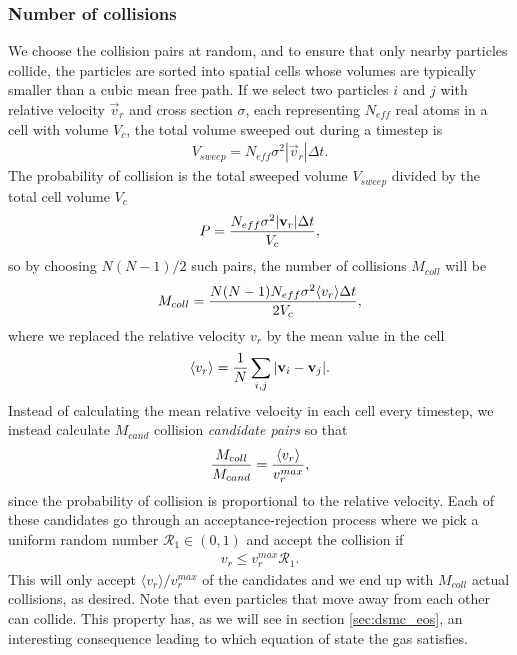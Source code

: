 \subsubsection{Number of collisions}
We choose the collision pairs at random, and to ensure that only nearby particles collide, the particles are sorted into spatial cells whose volumes are typically smaller than a cubic mean free path. If we select two particles $i$ and $j$ with relative velocity $\vec v_r$ and cross section $\sigma$, each representing $N_{eff}$ real atoms in a cell with volume $V_c$, the total volume sweeped out during a timestep is
\begin{align}
	V_{sweep} = N_{eff}\sigma^2|\vec v_r|\Delta t.
\end{align}
The probability of collision is the total sweeped volume $V_{sweep}$ divided by the total cell volume $V_c$
\begin{align}
	P = {N_{eff}\sigma^2|\vec v_r|\Delta t \over V_c},
\end{align}
so by choosing $N(N-1)/2$ such pairs, the number of collisions $M_{coll}$ will be
\begin{align}
	M_{coll} = {N(N-1)N_{eff}\sigma^2\langle v_r \rangle \Delta t\over 2 V_c},
\end{align}
where we replaced the relative velocity $v_r$ by the mean value in the cell
\begin{align}
	\langle v_r \rangle = {1\over N} \sum_{i,j} |\vec v_i - \vec v_j|.
\end{align}
Instead of calculating the mean relative velocity in each cell every timestep, we instead calculate $M_{cand}$ collision \textit{candidate pairs} so that
\begin{align}
	{M_{coll}\over M_{cand}} = {\langle v_r\rangle \over v_r^{max}},
\end{align}
since the probability of collision is proportional to the relative velocity. Each of these candidates go through an acceptance-rejection process where we pick a uniform random number $\mathcal{R}_1\in (0,1)$ and accept the collision if
\begin{align}
	v_r \leq v_r^{max}\mathcal{R}_1.
\end{align}
This will only accept $\langle v_r\rangle/v_r^{max}$ of the candidates and we end up with $M_{coll}$ actual collisions, as desired. Note that even particles that move away from each other can collide. This property has, as we will see in section \ref{sec:dsmc_eos}, an interesting consequence leading to which equation of state the gas satisfies.
